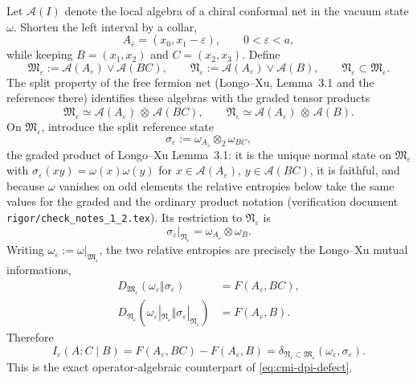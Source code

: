 \documentclass[11pt]{article}
\theoremstyle{accenttheorem}
\theoremstyle{definition}
\newcommand{\cA}{\mathcal{A}}
\newcommand{\cM}{\mathfrak{M}}
\newcommand{\cN}{\mathfrak{N}}
\newcommand{\MI}{F}
\newcommand{\CMI}{I}
\newcommand{\eps}{\varepsilon}
\newcommand{\1}{\mathbf{1}}
\begin{document}
Let \(\cA(I)\) denote the local algebra of a chiral conformal net in the vacuum state \(\omega\).  Shorten the left interval by a collar,
\[
 A_\eps=(x_0,x_1-\eps),\qquad 0<\eps<a,
\]
while keeping
\(B=(x_1,x_2)\) and \(C=(x_2,x_3)\).  Define
\begin{equation}\label{eq:MN-def}
 \cM_\eps:=\cA(A_\eps)\vee\cA(BC),
 \qquad
 \cN_\eps:=\cA(A_\eps)\vee\cA(B),
 \qquad
 \cN_\eps\subset\cM_\eps.
\end{equation}
The split property of the free fermion net (Longo--Xu, Lemma~3.1 and the references there) identifies these algebras with the graded tensor products
\begin{equation}\label{eq:split-identification}
 \cM_\eps\simeq
 \cA(A_\eps)\,\overline\otimes\,\cA(BC),
 \qquad
 \cN_\eps\simeq
 \cA(A_\eps)\,\overline\otimes\,\cA(B).
\end{equation}
On \(\cM_\eps\), introduce the split reference state
\begin{equation}\label{eq:split-reference}
 \sigma_\eps:=\omega_{A_\eps}\otimes_2\omega_{BC},
\end{equation}
the graded product of Longo--Xu Lemma~3.1: it is the unique normal state on \(\cM_\eps\) with \(\sigma_\eps(xy)=\omega(x)\omega(y)\) for \(x\in\cA(A_\eps)\), \(y\in\cA(BC)\), it is faithful, and because \(\omega\) vanishes on odd elements the relative entropies below take the same values for the graded and the ordinary product notation (verification document \texttt{rigor/check\_notes\_1\_2.tex}).  Its restriction to \(\cN_\eps\) is
\[
 \sigma_\eps|_{\cN_\eps}=\omega_{A_\eps}\otimes\omega_B.
\]
Writing \(\omega_\eps:=\omega|_{\cM_\eps}\), the two relative entropies are precisely the Longo--Xu mutual informations,
\begin{align}
 D_{\cM_\eps}(\omega_\eps\Vert\sigma_\eps)
 &=\MI(A_\eps,BC),\label{eq:MI-big}\\
 D_{\cN_\eps}(\omega_\eps|_{\cN_\eps}\Vert\sigma_\eps|_{\cN_\eps})
 &=\MI(A_\eps,B).\label{eq:MI-small}
\end{align}
Therefore
\begin{equation}\label{eq:Ieps-defect}
 \boxed{
 \CMI_\eps(A:C\mid B)
 =\MI(A_\eps,BC)-\MI(A_\eps,B)
 =\delta_{\cN_\eps\subset\cM_\eps}(\omega_\eps,\sigma_\eps).
 }
\end{equation}
This is the exact operator-algebraic counterpart of \eqref{eq:cmi-dpi-defect}.
\end{document}
